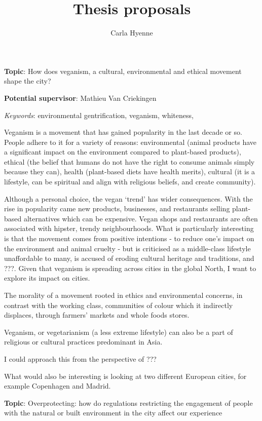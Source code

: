 \documentclass{article}
\title{Thesis proposals}
\author{Carla Hyenne}
\date{}
\begin{document}
\maketitle

\textbf{Topic}: How does veganism, a cultural, environmental and ethical movement shape the city?

\textbf{Potential supervisor}: Mathieu Van Criekingen 

\textit{Keywords}: environmental gentrification, veganism, whiteness, 

Veganism is a movement that has gained popularity in the last decade or so. People adhere to it for a variety of reasons: environmental (animal products have a significant impact on the environment compared to plant-based products), ethical (the belief that humans do not have the right to consume animals simply because they can), health (plant-based diets have health merits), cultural (it is a lifestyle, can be spiritual and align with religious beliefs, and create community). 

Although a personal choice, the vegan `trend' has wider consequences. With the rise in popularity came new products, businesses, and restaurants selling plant-based alternatives which can be expensive. Vegan shops and restaurants are often associated with hipster, trendy neighbourhoods. 
What is particularly interesting is that the movement comes from positive intentions - to reduce one's impact on the environment and animal cruelty - but is criticised as a middle-class lifestyle unaffordable to many, is accused of eroding cultural heritage and traditions, and ???. Given that veganism is spreading across cities in the global North, I want to explore its impact on cities.

The morality of a movement rooted in ethics and environmental concerns, in contrast with the working class, communities of colour which it indirectly displaces, through farmers' markets and whole foods stores.

Veganism, or vegetarianism (a less extreme lifestyle) can also be a part of religious or cultural practices predominant in Asia. 

I could approach this from the perspective of ???


What would also be interesting is looking at two different European cities, for example Copenhagen and Madrid. 


\textbf{Topic}: Overprotecting: how do regulations restricting the engagement of people with the natural or built environment in the city affect our experience
\end{document}
